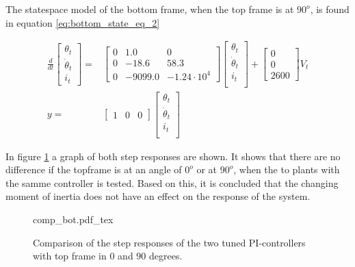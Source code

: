 \documentclass[../../../Main]{subfiles}
\begin{document}
The statespace model of the bottom frame, when the top frame is at $90^o$, is found in equation \eqref{eq:bottom_state_eq_2}

\begin{equation}
      \label{eq:bottom_state_eq_2}
      \begin{split}
      \frac{d}{dt}
    \begin{bmatrix}
        \theta_t \\
        \dot \theta_t \\
        i_t
    \end{bmatrix}
    =&
    \begin{bmatrix}0 & 1.0 & 0\\ 0 & -18.6 & 58.3\\ 0 & -9099.0 & -1.24\cdot10^4\end{bmatrix}
    \begin{bmatrix}
        \theta_t \\
        \dot \theta_t \\
        i_t \\
    \end{bmatrix}
    +
    \begin{bmatrix}
      0\\ 0\\ 2600
    \end{bmatrix}
    V_t
\\
      y =&
    \begin{bmatrix}
        1 & 0 & 0
    \end{bmatrix}
    \begin{bmatrix}
        \theta_t \\
        \dot \theta_t\\
        i_t\\
    \end{bmatrix}
    \end{split}
\end{equation}



In figure \ref{fig:comp_bot} a graph of both step responses are shown. It shows that there are no difference if the topframe is at an angle of $0^o$ or at $90^o$, when the to plants with the samme controller is tested. Based on this, it is concluded that the changing moment of inertia does not have an effect on the response of the system.


\begin{figure}[H]
\centering
\def\svgwidth{\textwidth}
{comp_bot.pdf_tex}
\caption{Comparison of the step responses of the two tuned PI-controllers with top frame in $0$ and $90$ degrees.}
\label{fig:comp_bot}
\end{figure}
\end{document}
